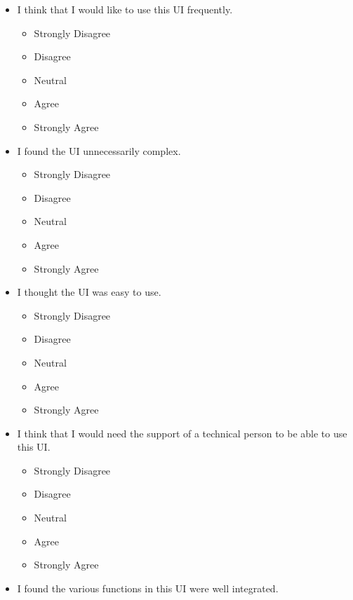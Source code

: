 \documentclass[doublespace,draft,nopageskip]{VTthesis} %
\begin{document}
\begin{itemize}
    \begin{itemize}
        \item I think that I would like to use this UI frequently.
            \begin{itemize}
                \item Strongly Disagree
                \item Disagree
                \item Neutral
                \item Agree
                \item Strongly Agree
            \end{itemize}
	\item I found the UI unnecessarily complex.
            \begin{itemize}
                \item Strongly Disagree
                \item Disagree
                \item Neutral
                \item Agree
                \item Strongly Agree
            \end{itemize}
	\item I thought the UI was easy to use.
            \begin{itemize}
                \item Strongly Disagree
                \item Disagree
                \item Neutral
                \item Agree
                \item Strongly Agree
            \end{itemize}
        \item I think that I would need the support of a technical person to be able to use this UI.
            \begin{itemize}
                \item Strongly Disagree
                \item Disagree
                \item Neutral
                \item Agree
                \item Strongly Agree
            \end{itemize}
        \item I found the various functions in this UI were well integrated.
            \begin{itemize}

\end{itemize}
\end{itemize}
\end{itemize}
\end{document}
